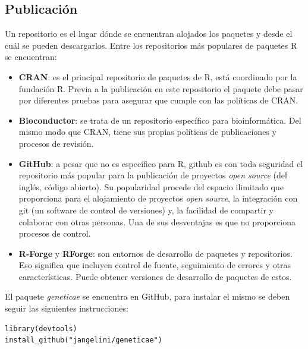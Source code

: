 \subsection{Publicación}
Un repositorio es el lugar dónde se encuentran alojados los paquetes y desde el cuál se pueden descargarlos. Entre los repositorios más populares de paquetes R se encuentran:

\begin{itemize}
\item \textbf{CRAN}: es el principal repositorio de paquetes de R, está coordinado por la fundación R. Previa a la publicación en este repositorio el paquete debe pasar por diferentes pruebas para asegurar que cumple con las políticas de CRAN.

\item \textbf{Bioconductor}: se trata de un repositorio específico para bioinformática. Del mismo modo que CRAN, tiene sus propias políticas de publicaciones y procesos de revisión.

\item \textbf{GitHub}: a pesar que no es específico para R, github es con toda seguridad el repositorio más popular para la publicación de proyectos \emph{open source} (del inglés, código abierto). Su popularidad procede del espacio ilimitado que proporciona para el alojamiento de proyectos \emph{open source}, la integración con git (un software de control de versiones) y, la facilidad de compartir y colaborar con otras personas. Una de sus desventajas es que no proporciona procesos de control.

\item \textbf{R-Forge} y \textbf{RForge}: son entornos de desarrollo de paquetes y repositorios. Eso significa que incluyen control de fuente, seguimiento de errores y otras características. Puede obtener versiones de desarrollo de paquetes de estos.
\end{itemize}

El paquete \emph{geneticae} se encuentra en GitHub, para instalar el mismo se deben seguir las siguientes instrucciones:

\begin{lstlisting}
library(devtools)
install_github("jangelini/geneticae") 
\end{lstlisting}






